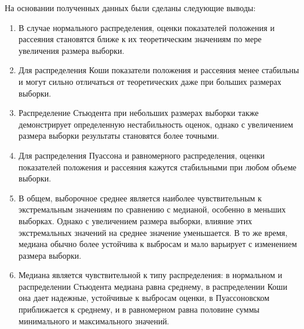 \documentclass[12pt,a4paper]{article}
\begin{document}
	На основании полученных данных были сделаны следующие выводы:

	\begin{enumerate}
		\item В случае нормального распределения, оценки показателей положения и рассеяния становятся ближе к их теоретическим значениям по мере увеличения размера выборки.
		\item Для распределения Коши показатели положения и рассеяния менее стабильны и могут сильно отличаться от теоретических даже при больших размерах выборки.
		\item Распределение Стьюдента при небольших размерах выборки также демонстрирует определенную нестабильность оценок, однако с увеличением размера выборки результаты становятся более точными.
		\item Для распределения Пуассона и равномерного распределения, оценки показателей положения и рассеяния кажутся стабильными при любом объеме выборки.
		\item В общем, выборочное среднее является наиболее чувствительным к экстремальным значениям по сравнению с медианой, особенно в меньших выборках. Однако с увеличением размера выборки, влияние этих экстремальных значений на среднее значение уменьшается. В то же время, медиана обычно более устойчива к выбросам и мало варьирует с изменением размера выборки.
		\item Медиана является чувствительной к типу распределения: в нормальном и распределении Стьюдента медиана равна среднему, в распределении Коши она дает надежные, устойчивые к выбросам оценки, в Пуассоновском приближается к среднему, и в равномерном равна половине суммы минимального и максимального значений.
	\end{enumerate}
\end{document}
